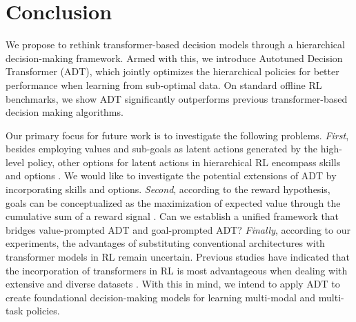 
\section{Conclusion}


We propose to rethink transformer-based decision models through a hierarchical decision-making framework.  
Armed with this, we introduce Autotuned Decision Transformer (ADT), 
which jointly optimizes the hierarchical policies for better performance when learning from sub-optimal data. 
On standard offline RL benchmarks, we show ADT significantly outperforms previous transformer-based decision making algorithms. 

Our primary focus for future work is to investigate the following problems. 
\emph{First}, besides employing values and sub-goals as latent actions generated by the high-level policy, other options for latent actions in hierarchical RL encompass skills \citep{ajay2020opal} and options \citep{sutton1999between}. We would like to investigate the potential extensions of ADT by incorporating skills and options. 
\emph{Second}, according to the reward hypothesis, goals can be conceptualized as the maximization of expected value through the cumulative sum of a reward signal \citep{silver2021reward,bowling2023settling}. Can we establish a unified framework that bridges value-prompted ADT and goal-prompted ADT? 
\emph{Finally}, according to our experiments, the advantages of substituting conventional architectures with transformer models in RL remain uncertain. 
Previous studies have indicated that the incorporation of transformers in RL is most advantageous when dealing with extensive and diverse datasets \citep{chebotar2023q}. 
With this in mind, we intend to apply ADT to create foundational decision-making models for learning multi-modal and multi-task policies.


